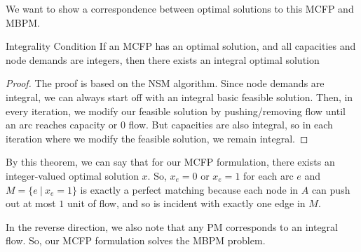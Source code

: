 \begin{minipage}{\textwidth}
    \centering
\end{minipage}

We want to show a correspondence between optimal solutions to this MCFP and MBPM. 
\begin{theorem}{Integrality Condition}{}
    If an MCFP has an optimal solution, and all capacities and node demands are integers, then there exists an integral optimal solution
\end{theorem}
\begin{proof}
    The proof is based on the NSM algorithm. 
    Since node demands are integral, we can always start off with an integral basic feasible solution.
    Then, in every iteration, we modify our feasible solution by pushing/removing flow until an arc reaches capacity or $0$ flow.
    But capacities are also integral, so in each iteration where we modify the feasible solution, we remain integral.
\end{proof}
By this theorem, we can say that for our MCFP formulation, there exists an integer-valued optimal solution $x$.
So, $x_e = 0$ or $x_e = 1$ for each arc $e$ and $M = \{e\:|\:x_e = 1\}$ is exactly a perfect matching because each node in $A$ can push out at most $1$ unit of flow, and so is incident with exactly one edge in $M$.

In the reverse direction, we also note that any PM corresponds to an integral flow. So, our MCFP formulation solves the MBPM problem.